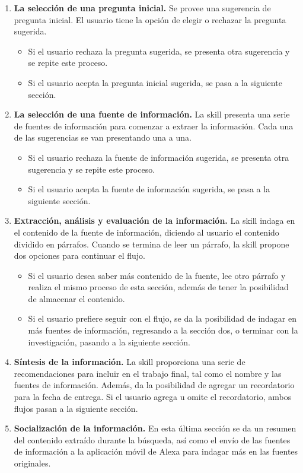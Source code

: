 \begin{enumerate}
  \item \textbf{La selección de una pregunta inicial.} Se provee una sugerencia de pregunta inicial. El usuario tiene la opción de elegir o rechazar la pregunta sugerida.
  \begin{itemize}
    \item Si el usuario rechaza la pregunta sugerida, se presenta otra sugerencia y se repite este proceso.
    \item Si el usuario acepta la pregunta inicial sugerida, se pasa a la siguiente sección.
  \end{itemize}
  \item \textbf{La selección de una fuente de información.} La skill presenta una serie de fuentes de información para comenzar a extraer la información. Cada una de las sugerencias se van presentando una a una.
  \begin{itemize}
    \item Si el usuario rechaza la fuente de información sugerida, se presenta otra sugerencia y se repite este proceso.
    \item Si el usuario acepta la fuente de información sugerida, se pasa a la siguiente sección.
  \end{itemize}
  \item \textbf{Extracción, análisis y evaluación de la información.} La skill indaga en el contenido de la fuente de información, diciendo al usuario el contenido dividido en párrafos. Cuando se termina de leer un párrafo, la skill propone dos opciones para continuar el flujo.
  \begin{itemize}
    \item Si el usuario desea saber más contenido de la fuente, lee otro párrafo y realiza el mismo proceso de esta sección, además de tener la posibilidad de almacenar el contenido.
    \item Si el usuario prefiere seguir con el flujo, se da la posibilidad de indagar en más fuentes de información, regresando a la sección dos, o terminar con la investigación, pasando a la siguiente sección.
  \end{itemize}
  \item \textbf{Síntesis de la información.} La skill proporciona una serie de recomendaciones para incluir en el trabajo final, tal como el nombre y las fuentes de información. Además, da la posibilidad de agregar un recordatorio para la fecha de entrega. Si el usuario agrega u omite el recordatorio, ambos flujos pasan a la siguiente sección.
  \item \textbf{Socialización de la información.} En esta última sección se da un resumen del contenido extraído durante la búsqueda, así como el envío de las fuentes de información a la aplicación móvil de Alexa para indagar más en las fuentes originales.
\end{enumerate}

